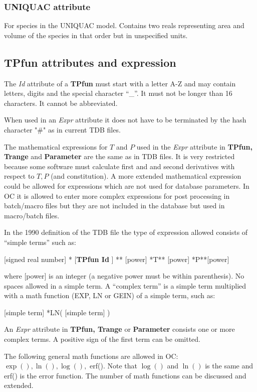 \documentclass{article}
\begin{document}
\subsubsection{UNIQUAC attribute}\label{sec:uniquac}

For species in the UNIQUAC model.  Contains two reals representing
area and volume of the species in that order but in unspecified units.

\subsection{TPfun attributes and expression}\label{sec:tpfunattr}\label{sec:expr}

The {\em Id} attribute of a {\bf TPfun} must start with a letter A-Z
and may contain letters, digits and the special character ``\_''.  It
must not be longer than 16 characters.  It cannot be abbreviated.

When used in an {\em Expr} attribute it does not have to be terminated
by the hash character "\#" as in current TDB files.

The mathematical expressions for $T$ and $P$ used in the {\em Expr}
attribute in {\bf TPfun, Trange} and {\bf Parameter} are the same as
in TDB files.  It is very restricted because some software must
calculate first and and second derivatives with respect to $T, P$ (and
constitution).  A more extended mathematical expression could be
allowed for expressions which are not used for database parameters.
In OC it is allowed to enter more complex expressions for post
processing in batch/macro files but they are not included in the
database but used in macro/batch files.

In the 1990 definition of the TDB file the type of expression allowed
consists of ``simple terms'' such as:

[signed real number] * [{\bf TPfun Id} ] ** [power] *T** [power] *P**[power]

where [power] is an integer (a negative power must be within
parenthesis).  No spaces allowed in a simple term.  A ``complex term''
is a simple term multiplied with a math function (EXP, LN or GEIN) of
a simple term, such as:

[simple term] *LN( [simple term] )

An {\em Expr} attribute in {\bf TPfun, Trange} or {\bf Parameter}
consists one or more complex terms.  A positive sign of the first term
can be omitted.
  
The following general math functions are allowed in OC:\\ $\exp(),
\ln(), \log(),$ erf().  Note that $\log()$ and $\ln()$ is the same and
erf() is the error function.  The number of math functions can be
discussed and extended.
\end{document}
